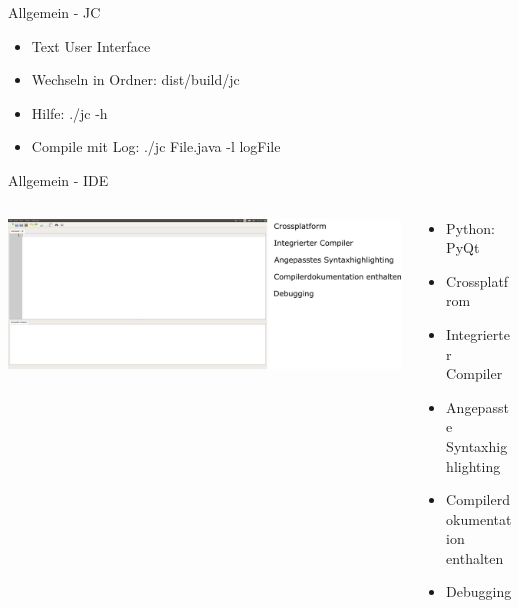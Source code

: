 \begin{frame}{Allgemein - JC}

\begin{itemize}
	\item Text User Interface
	\item Wechseln in Ordner: dist/build/jc
	\item Hilfe: ./jc -h
	\item Compile mit Log: ./jc File.java -l logFile
\end{itemize}

\end{frame}

\begin{frame}{Allgemein - IDE}

\begin{columns}
	\begin{column}{0.5\textwidth}
		\includegraphics[scale=0.1]{images/allgemein/ide.png}
	\end{column}
	\begin{column}{0.5\textwidth}
			\begin{itemize}
				\item Python: PyQt
				\item Crossplatfrom
				\item Integrierter Compiler
				\item Angepasste Syntaxhighlighting
				\item Compilerdokumentation enthalten
				\item Debugging
			\end{itemize}
	\end{column}
\end{columns}


\end{frame}
